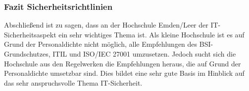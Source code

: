 \subsubsection{Fazit Sicherheitsrichtlinien}
Abschließend ist zu sagen, dass an der Hochschule Emden/Leer der IT-Sicherheitsaspekt ein sehr wichtiges Thema ist. Als kleine Hochschule ist es auf Grund der Personaldichte nicht möglich, alle Empfehlungen des BSI-Grundschutzes, ITIL und ISO/IEC 27001 umzusetzen. Jedoch sucht sich die Hochschule aus den Regelwerken die Empfehlungen heraus, die auf Grund der Personaldichte umsetzbar sind.  Dies bildet eine sehr gute Basis im Hinblick auf das sehr anspruchsvolle Thema IT-Sicherheit.


